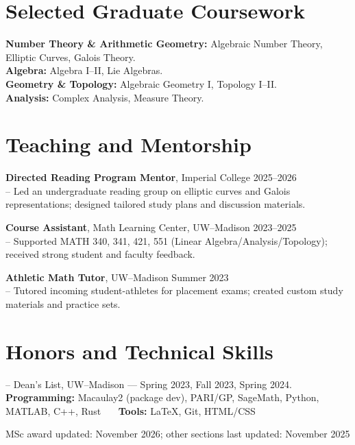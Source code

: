 \documentclass[11pt, a4paper]{article}
\newcommand{\sectionsep}{\vspace{0.28cm}}
\newcommand{\middot}{\ \textperiodcentered\ }
\begin{document}
\sectionsep

\section*{Selected Graduate Coursework}
\small
\textbf{Number Theory \& Arithmetic Geometry:} Algebraic Number Theory, Elliptic Curves, Galois Theory.\\
\textbf{Algebra:} Algebra I–II, Lie Algebras.\\
\textbf{Geometry \& Topology:} Algebraic Geometry I, Topology I–II.\\
\textbf{Analysis:} Complex Analysis, Measure Theory.

\normalsize

\sectionsep

\section*{Teaching and Mentorship}
\textbf{Directed Reading Program Mentor}, Imperial College \hfill 2025–2026\\
– Led an undergraduate reading group on elliptic curves and Galois representations; designed tailored study plans and discussion materials.

\vspace{0.08cm}
\noindent\textbf{Course Assistant}, Math Learning Center, UW–Madison \hfill 2023–2025\\
– Supported MATH 340, 341, 421, 551 (Linear Algebra/Analysis/Topology); received strong student and faculty feedback.

\vspace{0.08cm}
\noindent\textbf{Athletic Math Tutor}, UW–Madison \hfill Summer 2023\\
– Tutored incoming student-athletes for placement exams; created custom study materials and practice sets.

\sectionsep

\section*{Honors and Technical Skills}
– Dean’s List, UW–Madison — Spring 2023, Fall 2023, Spring 2024.\\
\textbf{Programming:} Macaulay2 (package dev), PARI/GP, SageMath, Python, MATLAB, C++, Rust \middot\ 
\textbf{Tools:} \LaTeX, Git, HTML/CSS

\vspace{0.25cm}
\begin{center}
\small MSc award updated: November 2026; other sections last updated: November 2025
\end{center}
\end{document}
